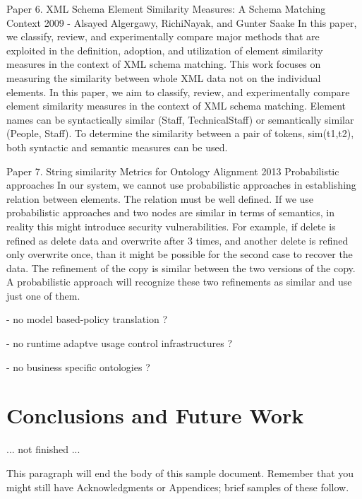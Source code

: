 \documentclass{sig-alternate}
\begin{document}
Paper 6. XML Schema Element Similarity Measures: A Schema Matching Context
2009 - Alsayed Algergawy, RichiNayak, and Gunter Saake
In this paper, we classify, review, and experimentally compare major methods that are exploited in the definition, adoption, and utilization of element similarity measures in the context of XML schema matching. 
This work focuses on measuring the similarity between whole XML data not on the individual elements. In this paper, we aim to classify, review, and experimentally compare element similarity measures in the context of XML schema matching.
Element names can be syntactically similar (Staff, TechnicalStaff) or semantically similar (People, Staff). To determine the similarity between a pair of tokens, sim(t1,t2), both syntactic and semantic measures can be used.

Paper 7. String similarity Metrics for Ontology Alignment
2013
Probabilistic approaches
In our system, we cannot use probabilistic approaches in establishing relation between elements. The relation must be well defined. If we use probabilistic approaches and two nodes are similar in terms of semantics, in reality this might introduce security vulnerabilities. For example, if delete is refined as delete data and overwrite after 3 times, and another delete is refined only overwrite once, than it might be possible for the second case to recover the data. The refinement of the copy is similar between the two versions of the copy. A probabilistic approach will recognize these two refinements as similar and use just one of them. 


- no model based-policy translation ?

- no runtime adaptve usage control infrastructures ?

- no business specific ontologies ?


\section{Conclusions and Future Work}
... not finished ...

This paragraph will end the body of this sample document.
Remember that you might still have Acknowledgments or
Appendices; brief samples of these
follow.




%

\end{document}
